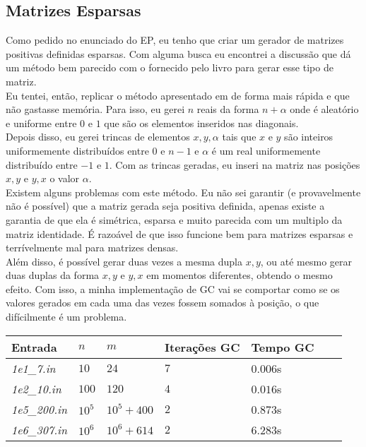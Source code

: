 \documentclass[
10pt, %
a4paper, %
oneside, %
headinclude,footinclude, %
BCOR5mm, %
]{scrartcl}
\begin{document}
\subsection{Matrizes Esparsas}
Como pedido no enunciado do EP, eu tenho que criar um gerador de matrizes positivas definidas esparsas. Com alguma busca eu encontrei a discussão \cite{darylmathexchange} que dá um método bem parecido com o fornecido pelo livro \cite{trefethen1997numerical} para gerar esse tipo de matriz. \\
Eu tentei, então, replicar o método apresentado em \cite{darylmathexchange} de forma mais rápida e que não gastasse memória. Para isso, eu gerei $n$ reais da forma $n+\alpha$ onde é aleatório e uniforme entre $0$ e $1$ que são os elementos inseridos nas diagonais. \\
Depois disso, eu gerei trincas de elementos $x, y, \alpha$ tais que $x$ e $y$ são inteiros uniformemente distribuídos entre $0$ e $n-1$ e $\alpha$ é um real uniformemente distribuído entre $-1$ e $1$. Com as trincas geradas, eu inseri na matriz nas posições $x,y$ e $y,x$ o valor $\alpha$. \\
Existem alguns problemas com este método. Eu não sei garantir (e provavelmente não é possível) que a matriz gerada seja positiva definida, apenas existe a garantia de que ela é simétrica, esparsa e muito parecida com um multiplo da matriz identidade. É razoável de que isso funcione bem para matrizes esparsas e terrívelmente mal para matrizes densas. \\
Além disso, é possível gerar duas vezes a mesma dupla $x,y$, ou até mesmo gerar duas duplas da forma $x,y$ e $y,x$ em momentos diferentes, obtendo o mesmo efeito. Com isso, a minha implementação de GC vai se comportar como se os valores gerados em cada uma das vezes fossem somados à posição, o que difícilmente é um problema. \\
\begin{tabular}{| l | l | l | l | l | l | l |}
    \hline
    Entrada & $n$ & $m$ & Iterações GC & Tempo GC \\ \hline
    \textit{1e1\_7.in} & $10$ & $24$ & $7$ & $0.006$s \\ \hline
    \textit{1e2\_10.in} & $100$ & $120$ & $4$ & $0.016$s \\ \hline
    \textit{1e5\_200.in} & $10^5$ & $10^5+400$ & $2$ & $0.873$s \\ \hline
    \textit{1e6\_307.in} & $10^6$ & $10^6+614$ & $2$ & $6.283$s \\ \hline
\end{tabular} \\
\end{document}

